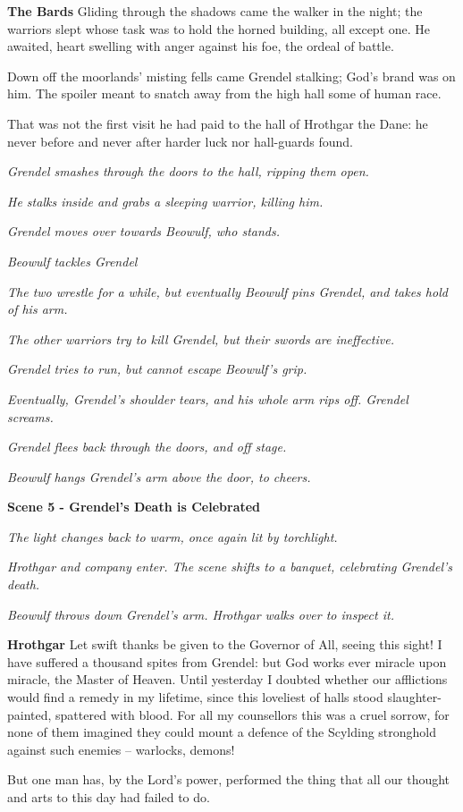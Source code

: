 \documentclass[a4paper]{article}
\begin{document}
{\textbf{The Bards} Gliding through the shadows came
the walker in the night; the warriors slept
whose task was to hold the horned building,
all except one. He awaited, heart swelling
with anger against his foe, the ordeal of battle.

Down off the moorlands' misting fells came
Grendel stalking; God's brand was on him.
The spoiler meant to snatch away
from the high hall some of human race.

That was not the first visit
he had paid to the hall of Hrothgar the Dane:
he never before and never after
harder luck nor hall-guards found.

\centerline{\textit{Grendel smashes through the doors to the hall, ripping them open.}}
\centerline{\textit{He stalks inside and grabs a sleeping warrior, killing him.}}
\centerline{\textit{Grendel moves over towards Beowulf, who stands.}}

\centerline{\textit{Beowulf tackles Grendel}}
\centerline{\textit{The two wrestle for a while, but eventually Beowulf pins Grendel, and takes hold of his arm.}}
\centerline{\textit{The other warriors try to kill Grendel, but their swords are ineffective.}}
\centerline{\textit{Grendel tries to run, but cannot escape Beowulf's grip.}}
\centerline{\textit{Eventually, Grendel's shoulder tears, and his whole arm rips off. Grendel screams.}}
\centerline{\textit{Grendel flees back through the doors, and off stage.}}
\centerline{\textit{Beowulf hangs Grendel's arm above the door, to cheers.}}

\newpage
\centerline{\textbf{Scene 5 - Grendel's Death is Celebrated}}
\centerline{\textit{The light changes back to warm, once again lit by torchlight.}}
\centerline{\textit{Hrothgar and company enter. The scene shifts to a banquet, celebrating Grendel's death.}}
\centerline{\textit{Beowulf throws down Grendel's arm. Hrothgar walks over to inspect it.}}

\textbf{Hrothgar} Let swift thanks be given to the Governor of All,
seeing this sight! I have suffered a thousand
spites from Grendel: but God works ever
miracle upon miracle, the Master of Heaven.
Until yesterday I doubted whether
our afflictions would find a remedy
in my lifetime, since this loveliest of halls
stood slaughter-painted, spattered with blood.
For all my counsellors this was a cruel sorrow,
for none of them imagined they could mount a defence
of the Scylding stronghold against such enemies –
warlocks, demons!

But one man has,
by the Lord's power, performed the thing
that all our thought and arts to this day
had failed to do. 

}
\end{document}
